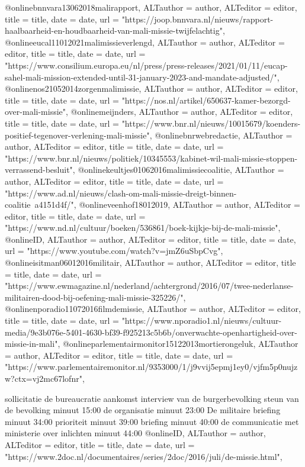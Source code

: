 {{{{{{{{{{{{{{\cite{ovvMortierOngevalMaliVideo} 





@online{bnnvara13062018malirapport,	ALTauthor = {author},	ALTeditor = {editor},	title = {title},	date = {date},	url = {"https://joop.bnnvara.nl/nieuws/rapport-haalbaarheid-en-houdbaarheid-van-mali-missie-twijfelachtig"},}
@online{eucal11012021malimissieverlengd,	ALTauthor = {author},	ALTeditor = {editor},	title = {title},	date = {date},	url = {"https://www.consilium.europa.eu/nl/press/press-releases/2021/01/11/eucap-sahel-mali-mission-extended-until-31-january-2023-and-mandate-adjusted/"},}
@online{nos21052014zorgenmalimissie,	ALTauthor = {author},	ALTeditor = {editor},	title = {title},	date = {date},	url = {"https://nos.nl/artikel/650637-kamer-bezorgd-over-mali-missie"},}
@online{meijnders,	ALTauthor = {author},	ALTeditor = {editor},	title = {title},	date = {date},	url = {"https://www.bnr.nl/nieuws/10015679/koenders-positief-tegenover-verlening-mali-missie"},}
@online{bnrwebredactie,	ALTauthor = {author},	ALTeditor = {editor},	title = {title},	date = {date},	url = {"https://www.bnr.nl/nieuws/politiek/10345553/kabinet-wil-mali-missie-stoppen-verrassend-besluit"},}
@online{keultjes01062016malimissiecoalitie,	ALTauthor = {author},	ALTeditor = {editor},	title = {title},	date = {date},	url = {"https://www.ad.nl/nieuws/clash-om-mali-missie-dreigt-binnen-coalitie~a4151d4f/"},}
@online{veenhof18012019,	ALTauthor = {author},	ALTeditor = {editor},	title = {title},	date = {date},	url = {"https://www.nd.nl/cultuur/boeken/536861/boek-kijkje-bij-de-mali-missie"},}
@online{ID,	ALTauthor = {author},	ALTeditor = {editor},	title = {title},	date = {date},	url = {"https://www.youtube.com/watch?v=jmZ6uSbpCvg"},}
@online{isitman06012016militair,	ALTauthor = {author},	ALTeditor = {editor},	title = {title},	date = {date},	url = {"https://www.ewmagazine.nl/nederland/achtergrond/2016/07/twee-nederlanse-militairen-dood-bij-oefening-mali-missie-325226/"},}
@online{nporadio11072016filmdemissie,	ALTauthor = {author},	ALTeditor = {editor},	title = {title},	date = {date},	url = {"https://www.nporadio1.nl/nieuws/cultuur-media/9e3b076e-5401-4630-bf39-f925213c5b6b/onverwachte-openhartigheid-over-missie-in-mali"},}
@online{parlementairmonitor15122013mortierongeluk,	ALTauthor = {author},	ALTeditor = {editor},	title = {title},	date = {date},	url = {"https://www.parlementairemonitor.nl/9353000/1/j9vvij5epmj1ey0/vjfm5p0nujzw?ctx=vj2mc67lofnr"},}


sollicitatie
de bureaucratie
aankomst
interview van de burgerbevolking
steun van de bevolking minuut 15:00
de organisatie minuut 23:00
De militaire briefing minuut 34:00
prioriteit minuut 39:00
briefing minuut 40:00
de communicatie met ministerie over inlichten minuut 44:00
@online{ID,	ALTauthor = {author},	ALTeditor = {editor},	title = {title},	date = {date},	url = {"https://www.2doc.nl/documentaires/series/2doc/2016/juli/de-missie.html"},}



}}}}}}}}}}}}}}
